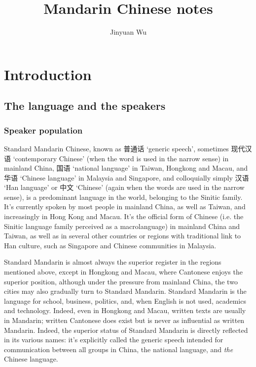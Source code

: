 \documentclass[UTF8, a4paper, oneside, scheme=plain, 12pt]{ctexrep}
\title{Mandarin Chinese notes}
\author{Jinyuan Wu}
\newcommand{\translate}[1]{`#1'}
\begin{document}
\maketitle

\automath

\tableofcontents

\chapter{Introduction}

\section{The language and the speakers}

\subsection{Speaker population}

Standard Mandarin Chinese,
known as 普通话 \translate{generic speech}, 
sometimes 现代汉语 \translate{contemporary Chinese} 
(when the word is used in the narrow sense) 
in mainland China, 
国语 \translate{national language} in Taiwan, Hongkong and Macau,
and 华语 \translate{Chinese language} in Malaysia and Singapore,
and colloquially simply 汉语 \translate{Han language} or 中文 \translate{Chinese}
(again when the words are used in the narrow sense),
is a predominant language in the world,
belonging to the Sinitic family.
It's currently spoken by most people in mainland China,
as well as Taiwan, 
and increasingly in Hong Kong and Macau.
It's the official form of Chinese 
(i.e. the Sinitic language family perceived as a macrolanguage)
in mainland China and Taiwan, 
as well as in several other countries or regions 
with traditional link to Han culture, 
such as Singapore and Chinese communities in Malaysia. 

Standard Mandarin is almost always the superior register 
in the regions mentioned above,
except in Hongkong and Macau, 
where Cantonese enjoys the superior position,
although under the pressure from mainland China, 
the two cities may also gradually turn to Standard Mandarin.
Standard Mandarin is the language for school, business, politics, 
and, when English is not used, 
academics and technology.
Indeed, even in Hongkong and Macau, 
written texts are usually in Mandarin;
written Cantonese does exist but is never as influential as written Mandarin.
Indeed, the superior status of Standard Mandarin is directly reflected in its various names: 
it's explicitly called the generic speech intended for 
communication between all groups in China, 
the national language, 
and \emph{the} Chinese language.
\end{document}
